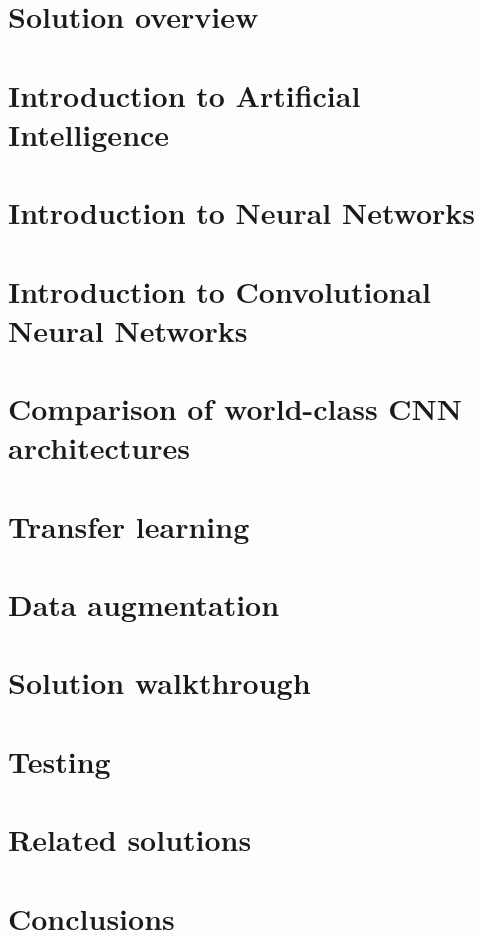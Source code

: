 \documentclass[11pt]{article}
\begin{document}
\section{Solution overview}


\section{Introduction to Artificial Intelligence}


\section{Introduction to Neural Networks}


\section{Introduction to Convolutional Neural Networks}


\section{Comparison of world-class CNN architectures}


\section{Transfer learning}


\section{Data augmentation}


\section{Solution walkthrough}


\section{Testing}


\section{Related solutions}


\section{Conclusions}



\clearpage


\end{document}

